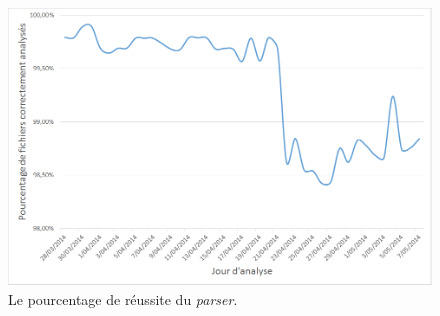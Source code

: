 \begin{figure}[!h]
	\centering
	\includegraphics[scale=.6]{Exp_40jours/Exp1_parser_success_rate.png}
	\caption{\label{Exp1_parser_success_rate}Le pourcentage de réussite du \textit{parser}.}
\end{figure}


